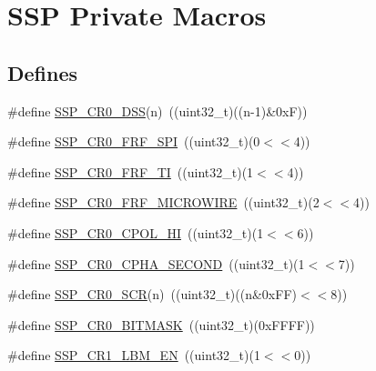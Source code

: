\hypertarget{group___s_s_p___private___macros}{\section{\-S\-S\-P \-Private \-Macros}
\label{group___s_s_p___private___macros}
}
\subsection*{\-Defines}
\begin{DoxyCompactItemize}
\item 
\#define \hyperlink{group___s_s_p___private___macros_ga691ba9dbc6a0722a81ed4734c7f7ac8f}{\-S\-S\-P\-\_\-\-C\-R0\-\_\-\-D\-S\-S}(n)~((uint32\-\_\-t)((n-\/1)\&0x\-F))
\item 
\#define \hyperlink{group___s_s_p___private___macros_ga4f0f58a8f4b87af0f18e84b981c31a74}{\-S\-S\-P\-\_\-\-C\-R0\-\_\-\-F\-R\-F\-\_\-\-S\-P\-I}~((uint32\-\_\-t)(0$<$$<$4))
\item 
\#define \hyperlink{group___s_s_p___private___macros_ga54c718a1a75a1e5e06417b9f8267ee27}{\-S\-S\-P\-\_\-\-C\-R0\-\_\-\-F\-R\-F\-\_\-\-T\-I}~((uint32\-\_\-t)(1$<$$<$4))
\item 
\#define \hyperlink{group___s_s_p___private___macros_ga7ca858fcf0f529a38e1e1bf0a69d4486}{\-S\-S\-P\-\_\-\-C\-R0\-\_\-\-F\-R\-F\-\_\-\-M\-I\-C\-R\-O\-W\-I\-R\-E}~((uint32\-\_\-t)(2$<$$<$4))
\item 
\#define \hyperlink{group___s_s_p___private___macros_ga36d7ad75edb14d318d710f964384f466}{\-S\-S\-P\-\_\-\-C\-R0\-\_\-\-C\-P\-O\-L\-\_\-\-H\-I}~((uint32\-\_\-t)(1$<$$<$6))
\item 
\#define \hyperlink{group___s_s_p___private___macros_gae4150d0b2513ff70568be15c2170c9ea}{\-S\-S\-P\-\_\-\-C\-R0\-\_\-\-C\-P\-H\-A\-\_\-\-S\-E\-C\-O\-N\-D}~((uint32\-\_\-t)(1$<$$<$7))
\item 
\#define \hyperlink{group___s_s_p___private___macros_ga10f56047b6024ff848675f9463f1b989}{\-S\-S\-P\-\_\-\-C\-R0\-\_\-\-S\-C\-R}(n)~((uint32\-\_\-t)((n\&0x\-F\-F)$<$$<$8))
\item 
\#define \hyperlink{group___s_s_p___private___macros_ga90be93bebdbdfee011d90ea6e054260a}{\-S\-S\-P\-\_\-\-C\-R0\-\_\-\-B\-I\-T\-M\-A\-S\-K}~((uint32\-\_\-t)(0x\-F\-F\-F\-F))
\item 
\#define \hyperlink{group___s_s_p___private___macros_gac0e5bef37b94df5ad96bf270aa802dcd}{\-S\-S\-P\-\_\-\-C\-R1\-\_\-\-L\-B\-M\-\_\-\-E\-N}~((uint32\-\_\-t)(1$<$$<$0))
\item 
$$
\end{DoxyCompactItemize}
